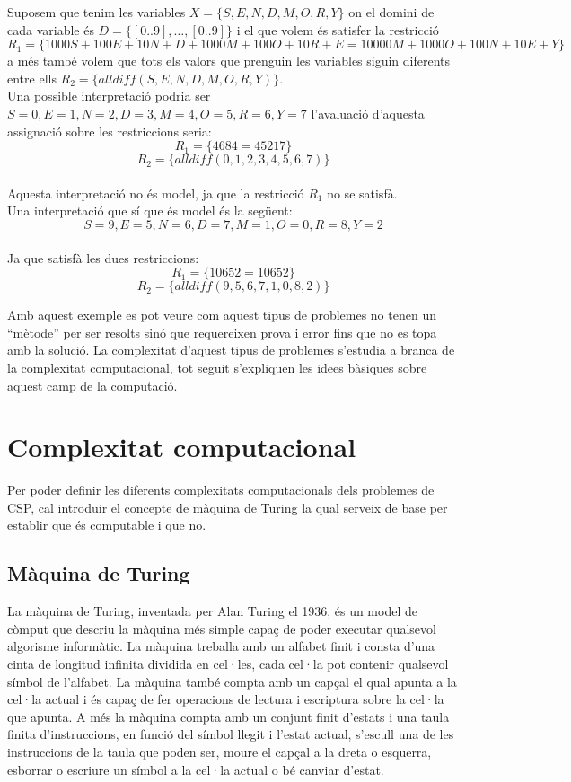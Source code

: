 Suposem que tenim les variables \( X = \{S, E, N, D, M, O, R, Y\} \) on el domini de cada variable és \( D = \{[0 .. 9], \ldots, [0 .. 9]\} \) i el que volem és satisfer la restricció \( R_1 = \{1000S + 100E + 10N + D + 1000M + 100O + 10R + E = 10000M + 1000O + 100N + 10E + Y\} \) a més també volem que tots els valors que prenguin les variables siguin diferents entre ells \( R_2 = \{alldiff(S, E, N, D, M, O, R, Y)\}\).\\
Una possible interpretació podria ser \(S=0, E=1, N=2, D=3, M=4, O=5, R=6, Y=7\) l'avaluació d'aquesta assignació sobre les restriccions seria:\\
$$ R_1 = \{4684 = 45217\} $$
$$ R_2 = \{alldiff(0, 1, 2, 3, 4, 5, 6, 7)\}$$\\
Aquesta interpretació no és model, ja que la restricció $R_1$ no se satisfà.\\
Una interpretació que sí que és model és la següent:
$$ S=9, E=5, N=6, D=7, M=1, O=0, R=8, Y=2 $$\\
Ja que satisfà les dues restriccions:\\
$$ R_1 = \{10652 = 10652\} $$
$$ R_2 = \{alldiff(9, 5, 6, 7, 1, 0, 8, 2)\}$$

Amb aquest exemple es pot veure com aquest tipus de problemes no tenen un ``mètode'' per ser resolts sinó que requereixen prova i error fins que no es topa amb la solució. La complexitat d'aquest tipus de problemes s'estudia a branca de la complexitat computacional, tot seguit s'expliquen les idees bàsiques sobre aquest camp de la computació.

\section{Complexitat computacional}
Per poder definir les diferents complexitats computacionals dels problemes de CSP, cal introduir el concepte de màquina de Turing la qual serveix de base per establir que és computable i que no.

\subsection{Màquina de Turing}
La màquina de Turing, inventada per Alan Turing el 1936, és un model de còmput que descriu la màquina més simple capaç de poder executar qualsevol algorisme informàtic. La màquina treballa amb un alfabet finit i consta d'una cinta de longitud infinita dividida en cel·les, cada cel·la pot contenir qualsevol símbol de l'alfabet. La màquina també compta amb un capçal el qual apunta a la cel·la actual i és capaç de fer operacions de lectura i escriptura sobre la cel·la que apunta. A més la màquina compta amb un conjunt finit d'estats i una taula finita d'instruccions, en funció del símbol llegit i l'estat actual, s'escull una de les instruccions de la taula que poden ser, moure el capçal a la dreta o esquerra, esborrar o escriure un símbol a la cel·la actual o bé canviar d'estat.

